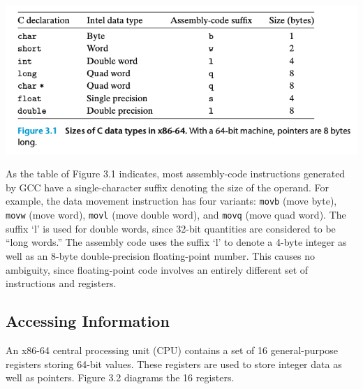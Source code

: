 \documentclass[11pt]{article}
\begin{document}
\begin{center}
\includegraphics[width=.9\linewidth]{pics/sizes-of-c-data-types.png}
\end{center}

As the table of Figure 3.1 indicates, most assembly-code instructions generated by GCC have a single-character suffix denoting the size of the operand. For example, the data movement instruction has four variants: \texttt{movb} (move byte), \texttt{movw} (move word), \texttt{movl} (move double word), and \texttt{movq} (move quad word). The suffix ‘l’ is used for double words, since 32-bit quantities are considered to be “long words.” The assembly code uses the suffix ‘l’ to denote a 4-byte integer as well as an 8-byte double-precision floating-point number. This causes no ambiguity, since floating-point code involves an entirely different set of instructions and registers.\\

\subsection{Accessing Information}
\label{sec:orgb3b3572}
An x86-64 central processing unit (CPU) contains a set of 16 general-purpose registers storing 64-bit values. These registers are used to store integer data as well as pointers. Figure 3.2 diagrams the 16 registers.\\
\end{document}
